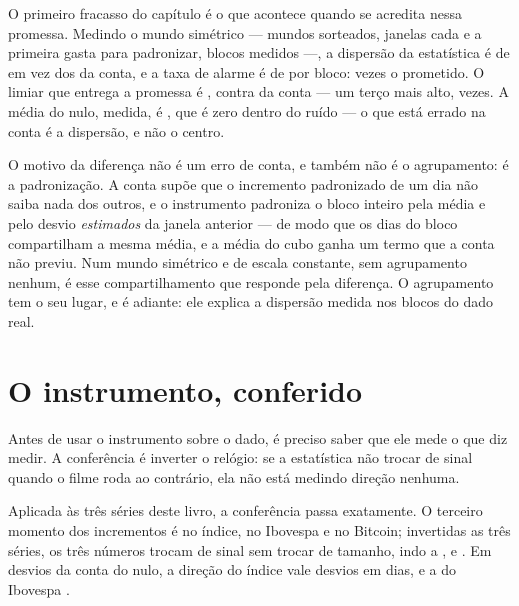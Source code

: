 O primeiro fracasso do capítulo é o que acontece quando se acredita nessa promessa. Medindo o mundo
simétrico --- \numDirecaoSementes{} mundos sorteados, \numDirecaoBlocosPorMundo{} janelas cada e a
primeira gasta para padronizar, \numDirecaoBlocosNulo{} blocos medidos ---, a dispersão da
estatística é de \numDirecaoNuloDispersao{} em vez dos \numDirecaoConta{} da conta, e a taxa de
alarme é de \numDirecaoNuloTaxa{} por bloco: \numDirecaoRazaoDasTaxas{} vezes o prometido. O limiar
que entrega a promessa é \numDirecaoLimiarMedido{}, contra \numDirecaoLimiar{} da conta --- um terço mais
alto, \numDirecaoLimiarMedidoRazao{} vezes. A média do nulo, medida, é \numDirecaoNuloMedia{}, que é zero
dentro do ruído --- o que está errado na conta é a dispersão, e não o centro.

O motivo da diferença não é um erro de conta, e também não é o agrupamento: é a padronização. A conta
supõe que o incremento padronizado de um dia não saiba nada dos outros, e o instrumento padroniza o
bloco inteiro pela média e pelo desvio \emph{estimados} da janela anterior --- de modo que os
\numDirecaoJanela{} dias do bloco compartilham a mesma média, e a média do cubo ganha um termo que a
conta não previu. Num mundo simétrico e de escala constante, sem agrupamento nenhum, é esse
compartilhamento que responde pela diferença. O agrupamento tem o seu lugar, e é adiante: ele explica
a dispersão medida nos blocos do dado real.

\section{O instrumento, conferido}

Antes de usar o instrumento sobre o dado, é preciso saber que ele mede o que diz medir. A conferência
é inverter o relógio: se a estatística não trocar de sinal quando o filme roda ao contrário, ela não
está medindo direção nenhuma.

Aplicada às três séries deste livro, a conferência passa exatamente. O terceiro momento dos
incrementos é \numDirecaoIndiceMomento{} no índice, \numDirecaoIbovespaMomento{} no Ibovespa e
\numDirecaoBitcoinMomento{} no Bitcoin; invertidas as três séries, os três números trocam de sinal
sem trocar de tamanho, indo a \numDirecaoIndiceInvertida{}, \numDirecaoIbovespaInvertida{} e
\numDirecaoBitcoinInvertida. Em desvios da conta do nulo, a direção do índice vale
\numDirecaoIndiceRazao{} desvios em \numDirecaoIndiceDias{} dias, e a do Ibovespa
\numDirecaoIbovespaRazao{}.

